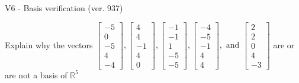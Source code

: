 \begin{exercise}
  \begin{exerciseTitle}V6 - Basis verification (ver. 937)\end{exerciseTitle}
  \begin{exerciseStatement}
    Explain why the vectors \(\left[\begin{array}{r}
-5 \\
0 \\
-5 \\
4 \\
-4
\end{array}\right] , \left[\begin{array}{r}
4 \\
4 \\
-1 \\
4 \\
0
\end{array}\right] , \left[\begin{array}{r}
-1 \\
-1 \\
1 \\
-5 \\
-5
\end{array}\right] , \left[\begin{array}{r}
-4 \\
-5 \\
-1 \\
4 \\
4
\end{array}\right] , \text{ and } \left[\begin{array}{r}
2 \\
2 \\
0 \\
4 \\
-3
\end{array}\right]\) are or are not a basis of \(\mathbb{R}^5\)	



\end{exerciseStatement}
\end{exercise}
